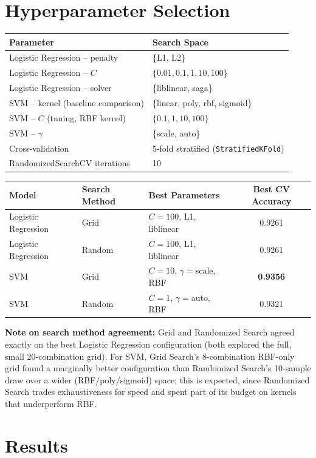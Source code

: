\documentclass[12pt,a4paper]{article}
\begin{document}
\section{Hyperparameter Selection}

\begin{tabular}{ll}
\toprule
Parameter & Search Space \\
\midrule
Logistic Regression -- penalty & \{L1, L2\} \\
Logistic Regression -- $C$ & $\{0.01, 0.1, 1, 10, 100\}$ \\
Logistic Regression -- solver & \{liblinear, saga\} \\
SVM -- kernel (baseline comparison) & \{linear, poly, rbf, sigmoid\} \\
SVM -- $C$ (tuning, RBF kernel) & $\{0.1, 1, 10, 100\}$ \\
SVM -- $\gamma$ & \{scale, auto\} \\
Cross-validation & 5-fold stratified (\texttt{StratifiedKFold}) \\
RandomizedSearchCV iterations & 10 \\
\bottomrule
\end{tabular}

\bigskip
\begin{tabular}{lllc}
\toprule
Model & Search Method & Best Parameters & Best CV Accuracy \\
\midrule
Logistic Regression & Grid & $C=100$, L1, liblinear & 0.9261 \\
Logistic Regression & Random & $C=100$, L1, liblinear & 0.9261 \\
SVM & Grid & $C=10$, $\gamma=$scale, RBF & \textbf{0.9356} \\
SVM & Random & $C=1$, $\gamma=$auto, RBF & 0.9321 \\
\bottomrule
\end{tabular}
\vspace{2mm}

\textbf{Note on search method agreement:} Grid and Randomized Search agreed exactly on
the best Logistic Regression configuration (both explored the full, small 20-combination
grid). For SVM, Grid Search's 8-combination RBF-only grid found a marginally better
configuration than Randomized Search's 10-sample draw over a wider (RBF/poly/sigmoid)
space; this is expected, since Randomized Search trades exhaustiveness for speed and spent
part of its budget on kernels that underperform RBF.

\section{Results}
\end{document}

